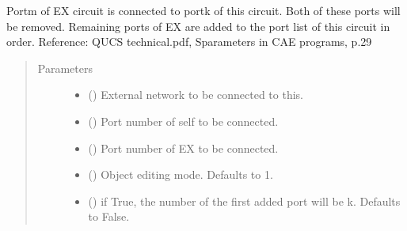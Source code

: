 \documentclass[letterpaper,10pt,english]{sphinxmanual}
\begin{document}
\begin{fulllineitems}
\begin{fulllineitems}
\label{\detokenize{touchstone:touchstone.spfile.connect_network_1_conn}}
Port\sphinxhyphen{}m of EX circuit is connected to port\sphinxhyphen{}k of this circuit. Both of these ports will be removed.
Remaining ports of EX are added to the port list of this circuit in order.
Reference: QUCS technical.pdf, S\sphinxhyphen{}parameters in CAE programs, p.29
\begin{quote}\begin{description}
\item[{Parameters}] \leavevmode\begin{itemize}
\item {} 
 ({\hyperref[\detokenize{touchstone:touchstone.spfile}]{}}) \textendash{} External network to be connected to this.

\item {} 
 () \textendash{} Port number of self to be connected.

\item {} 
 () \textendash{} Port number of EX to be connected.

\item {} 
 (\sphinxstyleliteralemphasis{\sphinxupquote{, }}) \textendash{} Object editing mode. Defaults to \sphinxhyphen{}1.

\item {} 
 (\sphinxstyleliteralemphasis{\sphinxupquote{, }}) \textendash{} if True, the number of the first added port will be k. Defaults to False.

\end{itemize}


\end{description}
\end{quote}
\end{fulllineitems}
\end{fulllineitems}
\end{document}
